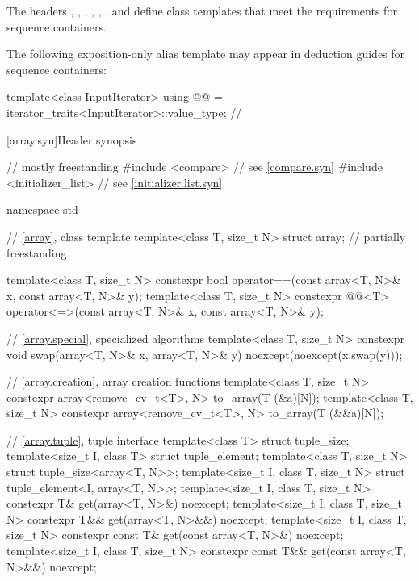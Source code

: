 \pnum
The headers
,
,
,
,
,
, and
define class templates that meet the requirements for sequence containers.

\pnum
The following exposition-only alias template may appear in deduction guides for sequence containers:

\begin{codeblock}
template<class InputIterator>
  using @@ = iterator_traits<InputIterator>::value_type;  // \expos
\end{codeblock}

[array.syn]{Header  synopsis}

%
\begin{codeblock}
// mostly freestanding
#include <compare>              // see \ref{compare.syn}
#include <initializer_list>     // see \ref{initializer.list.syn}

namespace std {
  // \ref{array}, class template 
  template<class T, size_t N> struct array;                             // partially freestanding

  template<class T, size_t N>
    constexpr bool operator==(const array<T, N>& x, const array<T, N>& y);
  template<class T, size_t N>
    constexpr @@<T>
      operator<=>(const array<T, N>& x, const array<T, N>& y);

  // \ref{array.special}, specialized algorithms
  template<class T, size_t N>
    constexpr void swap(array<T, N>& x, array<T, N>& y) noexcept(noexcept(x.swap(y)));

  // \ref{array.creation}, array creation functions
  template<class T, size_t N>
    constexpr array<remove_cv_t<T>, N> to_array(T (&a)[N]);
  template<class T, size_t N>
    constexpr array<remove_cv_t<T>, N> to_array(T (&&a)[N]);

  // \ref{array.tuple}, tuple interface
  template<class T> struct tuple_size;
  template<size_t I, class T> struct tuple_element;
  template<class T, size_t N>
    struct tuple_size<array<T, N>>;
  template<size_t I, class T, size_t N>
    struct tuple_element<I, array<T, N>>;
  template<size_t I, class T, size_t N>
    constexpr T& get(array<T, N>&) noexcept;
  template<size_t I, class T, size_t N>
    constexpr T&& get(array<T, N>&&) noexcept;
  template<size_t I, class T, size_t N>
    constexpr const T& get(const array<T, N>&) noexcept;
  template<size_t I, class T, size_t N>
    constexpr const T&& get(const array<T, N>&&) noexcept;
}
\end{codeblock}


